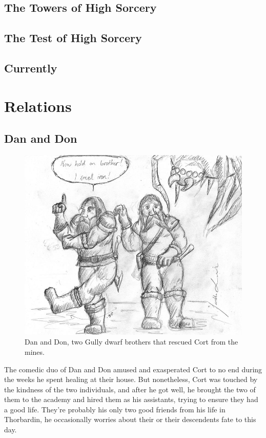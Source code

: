 \documentclass[12pt]{article}
\begin{document}
\subsection{The Towers of High Sorcery}
\subsection{The Test of High Sorcery}
\subsection{Currently}

\section{Relations}

\subsection{Dan and Don}

\begin{figure}[!htb]
  \centering
  \includegraphics[width=.75\textwidth]{./resources/dandon}
  \caption{Dan and Don, two Gully dwarf brothers that rescued Cort from the
  mines.}
\end{figure}

The comedic duo of Dan and Don amused and exasperated Cort to no end during the
weeks he spent healing at their house. But nonetheless, Cort was touched by the
kindness of the two individuals, and after he got well, he brought the two of
them to the academy and hired them as his assistants, trying to ensure they had
a good life. They're probably his only two good friends from his life in
Thorbardin, he occasionally worries about their or their descendents fate to
this day.
\end{document}
